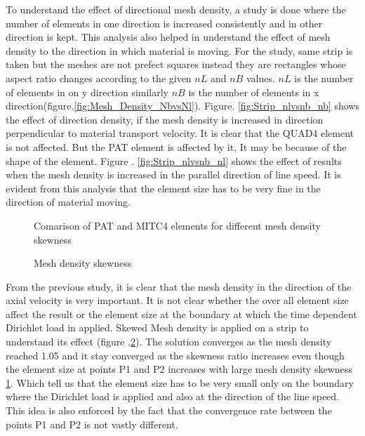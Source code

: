 \documentclass[main.tex]{subfiles}
\begin{document}
To understand the effect of directional mesh density, a study is done where the number of elements in one direction is increased consistently and in other direction is kept. This analysis also helped in understand the effect of mesh density to the direction in which material is moving. For the study, same strip is taken but the meshes are not prefect squares instead they are rectangles whose aspect ratio changes according to the given $nL$ and $nB$ values. $nL$ is the number of elements in on y direction similarly $nB$ is the number of elements in x direction(figure.\ref{fig:Mesh_Density_NbvsNl}). Figure. \ref{fig:Strip_nlvsnb_nb} shows the effect of direction density, if the mesh density is increased in direction perpendicular to material transport velocity. It is clear that the QUAD4 element is not affected. But the PAT element is affected by it, It may be because of the shape of the element. Figure . \ref{fig:Strip_nlvsnb_nl} shows the effect of results when the mesh density is increased in the parallel direction of line speed. It is evident from this analysis that the element size has to be very fine in the direction of material moving. 

\begin{figure}[h!]

\caption{Comarison of PAT and MITC4 elements for different mesh density skewness}
\label{fig:Strip_SR}
\end{figure}

\begin{figure}[h]
\centering

\caption{Mesh density skewness}
\label{fig:Strip_load_SR}
\end{figure}

From the previous study, it is clear that the mesh density in the direction of the axial velocity is very important. It is not clear whether the over all element size affect the result or the element size at the boundary at which the time dependent Dirichlet load in applied. Skewed Mesh density is applied on a strip to understand its effect (figure .\ref{fig:Strip_load_SR}). The solution converges as the mesh density reached 1.05 and it stay converged as the skewness ratio increases even though the element size at points P1 and P2 increases with large mesh density skewness \ref{fig:Strip_SR}. Which tell us that the element size has to be very small only on the boundary where the Dirichlet load is applied and also at the direction of the line speed. This idea is also enforced by the fact that the convergence rate between the points P1 and P2 is not vastly different. 
\end{document}
